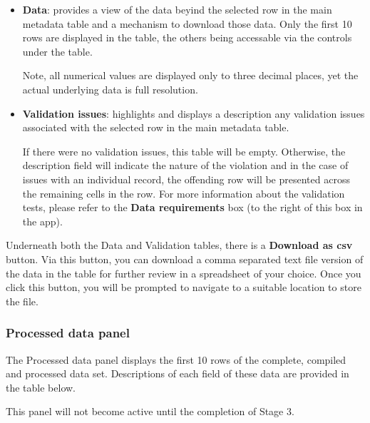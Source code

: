 \documentclass[
  8pt,
  a4paper]{article}
\begin{document}
\begin{itemize}
\item
  \textbf{Data}: provides a view of the data beyind the selected row in
  the main metadata table and a mechanism to download those data. Only
  the first 10 rows are displayed in the table, the others being
  accessable via the controls under the table.

  Note, all numerical values are displayed only to three decimal places,
  yet the actual underlying data is full resolution.
\item
  \textbf{Validation issues}: highlights and displays a description any
  validation issues associated with the selected row in the main
  metadata table.

  If there were no validation issues, this table will be empty.
  Otherwise, the description field will indicate the nature of the
  violation and in the case of issues with an individual record, the
  offending row will be presented across the remaining cells in the row.
  For more information about the validation tests, please refer to the
  \textbf{Data requirements} box (to the right of this box in the app).
\end{itemize}

Underneath both the Data and Validation tables, there is a
\textbf{Download as csv} button. Via this button, you can download a
comma separated text file version of the data in the table for further
review in a spreadsheet of your choice. Once you click this button, you
will be prompted to navigate to a suitable location to store the file.

\subsubsection{Processed data panel}\label{processed-data-panel}

The Processed data panel displays the first 10 rows of the complete,
compiled and processed data set. Descriptions of each field of these
data are provided in the table below.

\begin{tcolorbox}[enhanced jigsaw, opacityback=0, colbacktitle=quarto-callout-note-color!10!white, breakable, toprule=.15mm, left=2mm, bottomrule=.15mm, title=\textcolor{quarto-callout-note-color}{\faInfo}\hspace{0.5em}{Note}, bottomtitle=1mm, leftrule=.75mm, arc=.35mm, opacitybacktitle=0.6, coltitle=black, toptitle=1mm, titlerule=0mm, rightrule=.15mm, colback=white, colframe=quarto-callout-note-color-frame]

This panel will not become active until the completion of Stage 3.

\end{tcolorbox}
\end{document}
